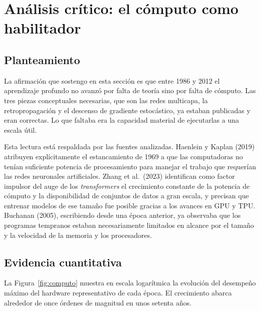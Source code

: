 \documentclass[12pt,letterpaper,oneside]{article}
\begin{document}
\section{Análisis crítico: el cómputo como habilitador}

\subsection{Planteamiento}

La afirmación que sostengo en esta sección es que entre 1986 y 2012 el aprendizaje profundo no avanzó por falta de teoría sino por falta de cómputo. Las tres piezas conceptuales necesarias, que son las redes multicapa, la retropropagación y el descenso de gradiente estocástico, ya estaban publicadas y eran correctas. Lo que faltaba era la capacidad material de ejecutarlas a una escala útil.

Esta lectura está respaldada por las fuentes analizadas. Haenlein y Kaplan (2019) atribuyen explícitamente el estancamiento de 1969 a que las computadoras no tenían suficiente potencia de procesamiento para manejar el trabajo que requerían las redes neuronales artificiales. Zhang et al.\ (2023) identifican como factor impulsor del auge de los \textit{transformers} el crecimiento constante de la potencia de cómputo y la disponibilidad de conjuntos de datos a gran escala, y precisan que entrenar modelos de ese tamaño fue posible gracias a los avances en GPU y TPU. Buchanan (2005), escribiendo desde una época anterior, ya observaba que los programas tempranos estaban necesariamente limitados en alcance por el tamaño y la velocidad de la memoria y los procesadores.

\subsection{Evidencia cuantitativa}

La Figura~\ref{fig:computo} muestra en escala logarítmica la evolución del desempeño máximo del hardware representativo de cada época. El crecimiento abarca alrededor de once órdenes de magnitud en unos setenta años.
\end{document}
